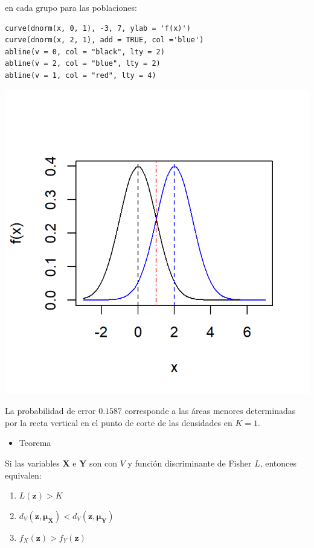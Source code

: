  en cada grupo para las poblaciones:
\begin{lstlisting}
curve(dnorm(x, 0, 1), -3, 7, ylab = 'f(x)')
curve(dnorm(x, 2, 1), add = TRUE, col ='blue')
abline(v = 0, col = "black", lty = 2)
abline(v = 2, col = "blue", lty = 2)
abline(v = 1, col = "red", lty = 4)
\end{lstlisting}
\begin{center}
\includegraphics[width=0.5\linewidth]{"Temas/Imágenes/Tema 5/screenshot004"}
\end{center}
La probabilidad de error $0.1587$ corresponde a las áreas menores determinadas por la recta vertical en el punto de corte de las densidades en $K=1$.
\begin{itemize}[label=\color{red}\textbullet, leftmargin=*]
	\item \color{lightblue}Teorema
\end{itemize}
Si las variables \textbf{X} e \textbf{Y} son  con  $V$ y función discriminante de Fisher $L$, entonces equivalen:
\begin{enumerate}[label=\color{lightblue}\arabic*)]
	\item $L(\mathbf{z})>K$
	\item $d_V(\mathbf{z,\mu_X})<d_V(\mathbf{z,\mu_Y})$
	\item $f_X(\mathbf{z})>f_Y(\mathbf{z})$
\end{enumerate}
